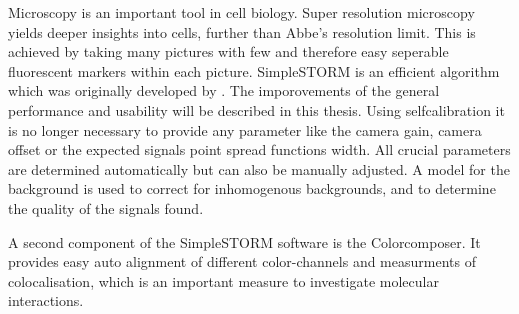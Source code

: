 Microscopy is an important tool in cell biology. Super resolution microscopy yields deeper insights into cells, further than Abbe's resolution limit. This is achieved by taking many pictures with few and therefore easy seperable fluorescent markers within each picture.\newline
SimpleSTORM is an efficient algorithm which was originally developed by \cite{MAJoachim}. The imporovements of the general performance and usability will be described in this thesis.\newline
Using selfcalibration it is no longer necessary to provide any parameter like the camera gain, camera offset or the expected signals point spread functions width. All crucial parameters are determined automatically but can also be manually adjusted. 
A model for the background is used to correct for inhomogenous backgrounds, and to determine the quality of the signals found.\newline

A second component of the SimpleSTORM software is the Colorcomposer. It provides easy auto alignment of different color-channels and measurments of colocalisation, which is an important measure to investigate molecular interactions.

